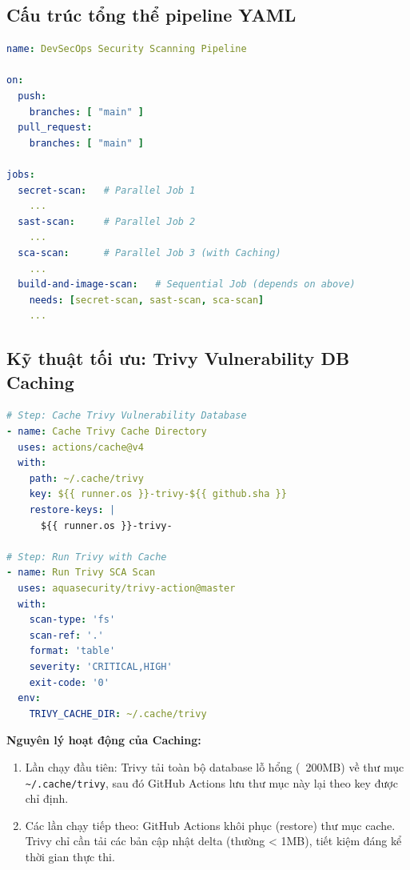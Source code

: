\documentclass[12pt,a4paper]{report}
\begin{document}
\subsection{Cấu trúc tổng thể pipeline YAML}

\begin{lstlisting}[language=YAML, caption={Cấu trúc tổng thể file devsecops.yml}]
name: DevSecOps Security Scanning Pipeline

on:
  push:
    branches: [ "main" ]
  pull_request:
    branches: [ "main" ]

jobs:
  secret-scan:   # Parallel Job 1
    ...
  sast-scan:     # Parallel Job 2
    ...
  sca-scan:      # Parallel Job 3 (with Caching)
    ...
  build-and-image-scan:   # Sequential Job (depends on above)
    needs: [secret-scan, sast-scan, sca-scan]
    ...
\end{lstlisting}

\subsection{Kỹ thuật tối ưu: Trivy Vulnerability DB Caching}

\begin{lstlisting}[language=YAML, caption={Cấu hình Cache cho Trivy Vulnerability Database}]
# Step: Cache Trivy Vulnerability Database
- name: Cache Trivy Cache Directory
  uses: actions/cache@v4
  with:
    path: ~/.cache/trivy
    key: ${{ runner.os }}-trivy-${{ github.sha }}
    restore-keys: |
      ${{ runner.os }}-trivy-

# Step: Run Trivy with Cache
- name: Run Trivy SCA Scan
  uses: aquasecurity/trivy-action@master
  with:
    scan-type: 'fs'
    scan-ref: '.'
    format: 'table'
    severity: 'CRITICAL,HIGH'
    exit-code: '0'
  env:
    TRIVY_CACHE_DIR: ~/.cache/trivy
\end{lstlisting}

\textbf{Nguyên lý hoạt động của Caching:}
\begin{enumerate}[leftmargin=2cm]
    \item Lần chạy đầu tiên: Trivy tải toàn bộ database lỗ hổng (~200MB) về thư mục \texttt{\textasciitilde/.cache/trivy}, sau đó GitHub Actions lưu thư mục này lại theo key được chỉ định.
    \item Các lần chạy tiếp theo: GitHub Actions khôi phục (restore) thư mục cache. Trivy chỉ cần tải các bản cập nhật delta (thường < 1MB), tiết kiệm đáng kể thời gian thực thi.
\end{enumerate}
\end{document}

